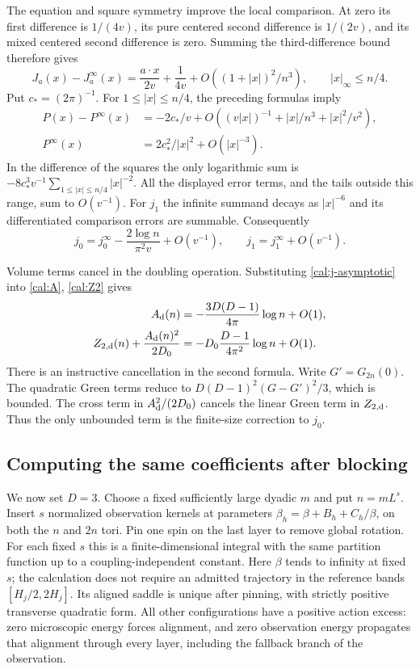 The equation and square symmetry improve the local comparison. At
zero its first difference is $1/(4v)$, its pure centered second
difference is $1/(2v)$, and its mixed centered second difference is zero.
Summing the third-difference bound therefore gives
\begin{equation}
\label{cal:green-quadratic}
 J_a(x)-J_a^\infty(x)=\frac{a\cdot x}{2v}+\frac1{4v}
                  +O((1+|x|)^2/n^3),\qquad |x|_\infty\le n/4.
\end{equation}
Put $c_*=(2\pi)^{-1}$. For $1\le|x|\le n/4$, the preceding formulas
imply
\begin{align*}
 P(x)-P^\infty(x)
   &=-2c_*/v+O((v|x|)^{-1}+|x|/n^3+|x|^2/v^2),\\
 P^\infty(x)&=2c_*^2/|x|^2+O(|x|^{-3}).
\end{align*}
In the difference of the squares the only logarithmic sum is
$-8c_*^3v^{-1}\sum_{1\le|x|\le n/4}|x|^{-2}$.
All the displayed error terms, and the tails outside this range, sum to
$O(v^{-1})$. For $j_1$ the infinite summand decays as $|x|^{-6}$ and
its differentiated comparison errors are summable. Consequently
\begin{equation}
\label{cal:j-asymptotic}
 j_0=j_0^\infty-\frac{2\log n}{\pi^2v}+O(v^{-1}),\qquad
 j_1=j_1^\infty+O(v^{-1}).
\end{equation}

Volume terms cancel in the doubling operation. Substituting
\eqref{cal:j-asymptotic} into \eqref{cal:A}, \eqref{cal:Z2} gives
\begin{align}
 A_{\rm d}(n)&=-\frac{3D(D-1)}{4\pi}\log n+O(1),
 \label{cal:direct1}\\
 Z_{2,\rm d}(n)+\frac{A_{\rm d}(n)^2}{2D_0}
       &=-D_0\frac{D-1}{4\pi^2}\log n+O(1).
 \label{cal:direct2}
\end{align}
There is an instructive cancellation in the second formula. Write
$G'=G_{2n}(0)$. The quadratic Green terms reduce to
$D(D-1)^2(G-G')^2/3$, which is bounded. The cross term in
$A_{\rm d}^2/(2D_0)$ cancels the linear Green term in $Z_{2,\rm d}$.
Thus the only unbounded term is the finite-size correction to $j_0$.

\subsection{Computing the same coefficients after blocking}

We now set $D=3$. Choose a fixed sufficiently large dyadic $m$ and put
$n=mL^s$. Insert $s$ normalized observation kernels at parameters
$\beta_h=\beta+B_h+C_h/\beta$, on both the $n$ and $2n$ tori. Pin one
spin on the last layer to remove global rotation. For each fixed $s$
this is a finite-dimensional integral with the same partition function
up to a coupling-independent constant. Here $\beta$ tends to infinity
at fixed $s$; the calculation does not require an admitted trajectory
in the reference bands $[H_j/2,2H_j]$. Its aligned saddle is unique
after pinning, with strictly positive transverse quadratic form.
All other configurations have a positive action excess: zero
microscopic energy forces alignment, and zero observation energy
propagates that alignment through every layer, including the fallback
branch of the observation.

